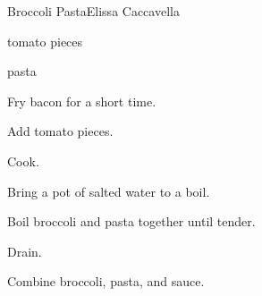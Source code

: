 \begin{recipe}{Broccoli Pasta}{Elissa Caccavella}{}

\begin{ingredients}
\item {}
\item tomato pieces
\item {}
\item pasta
\end{ingredients}

\begin{directions}
\item Fry bacon for a short time.
\item Add tomato pieces.
\item Cook.
\item Bring a pot of salted water to a boil.
\item Boil broccoli and pasta together until tender.
\item Drain.
\item Combine broccoli, pasta, and sauce.
\end{directions}

\end{recipe}
